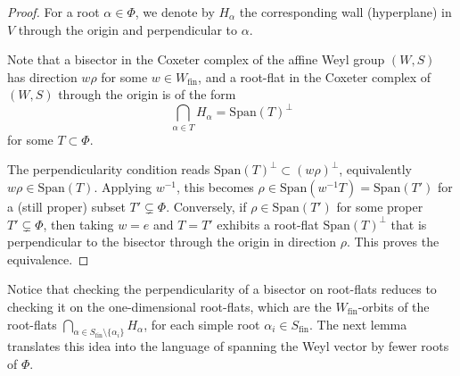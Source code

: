 \documentclass[11pt]{amsart}
\theoremstyle{plain}
\theoremstyle{definition}
\theoremstyle{remark}
\begin{document}
	\begin{proof} For a root $\alpha \in \Phi$, we denote by $H_\alpha$ the corresponding wall (hyperplane) in $V$ through the origin and perpendicular to $\alpha$.  
		
		Note that a bisector in the Coxeter complex of the affine Weyl group $(W,S)$ has direction $w\rho$ for some $w \in W_{\mathrm{fin}}$, and a root-flat in the Coxeter complex of $(W,S)$ through the origin is of the form
		\[
		\bigcap_{\alpha \in T} H_\alpha = \mathrm{Span}(T)^\perp
		\]
		for some $T \subset \Phi$.  
		
		The perpendicularity condition reads $\mathrm{Span}(T)^\perp \subset (w\rho)^\perp$, equivalently $w\rho \in \mathrm{Span}(T)$. Applying $w^{-1}$, this becomes $\rho \in \mathrm{Span}(w^{-1}T) = \mathrm{Span}(T')$ for a (still proper) subset $T' \subsetneq \Phi$. Conversely, if $\rho \in \mathrm{Span}(T')$ for some proper $T' \subsetneq \Phi$, then taking $w=e$ and $T=T'$ exhibits a root-flat $\mathrm{Span}(T)^\perp$ that is perpendicular to the bisector through the origin in direction $\rho$. This proves the equivalence.
	\end{proof}
	
	Notice that checking the perpendicularity of a bisector on root-flats reduces to checking it on the one-dimensional root-flats, which are the \( W_{\mathrm{fin}} \)-orbits of the root-flats \( \bigcap_{\alpha \in S_{\mathrm{fin}}  \setminus \{\alpha_i\}} H_\alpha \), for each simple root \( \alpha_i \in S_{\mathrm{fin}}  \). The next lemma translates this idea into the language of spanning the Weyl vector by fewer roots of \( \Phi \).
	
\end{document}
